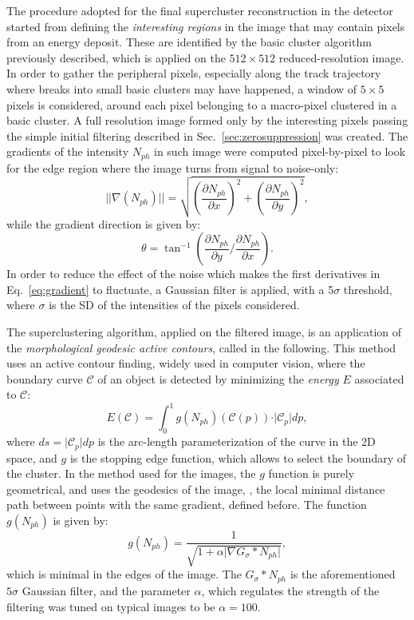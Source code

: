 The procedure adopted for the final supercluster reconstruction in the
\lemon detector started from defining the \textit{interesting regions}
in the image that may contain pixels from an energy deposit. These are
identified by the basic cluster algorithm \idbscan previously
described, which is applied on the $512\times512$ reduced-resolution
image. In order to gather the peripheral pixels, especially along the
track trajectory where breaks into small basic clusters may have happened,
a window of $5\times5$ pixels is considered, around each pixel
belonging to a macro-pixel clustered in a basic cluster. A full
resolution image formed only by the interesting pixels passing the
simple initial filtering described in Sec.~\ref{sec:zerosuppression}
was created.  The gradients of the intensity $N_{ph}$ in such image were
computed pixel-by-pixel to look for the edge region where the image
turns from signal to noise-only:
%
\begin{equation}
\label{eq:gradient}
\vert\vert\nabla(N_{ph})\vert\vert =
\sqrt{\left(\frac{\partial N_{ph}}{\partial x}\right)^2
  +\left(\frac{\partial N_{ph}}{\partial y}\right)^2},
\end{equation}
%
while the gradient direction is given by:
\begin{equation}
  \label{eq:graddir}
  \theta = \tan^{-1}\left(\frac{\partial N_{ph}}{\partial y}/\frac{\partial N_{ph}}{\partial x}\right).
\end{equation}
%
In order to reduce the effect of the noise which makes the first
derivatives in Eq.~\ref{eq:gradient} to fluctuate, a Gaussian filter
is applied, with a 5$\sigma$ threshold, where $\sigma$ is the SD of
the intensities of the pixels considered.

The superclustering algorithm, applied on the filtered image, is an
application of the \textit{morphological geodesic active
contours}\cite{gac,mgac}, called \gac in the following.  This method
uses an active contour finding, widely used in computer vision, where
the boundary curve $\mathcal{C}$ of an object is detected by
minimizing the \textit{energy} $E$  associated to $\mathcal{C}$:
\begin{equation}
  \label{eq:gacenergy}
  E(\mathcal{C}) = \int_{0}^{1} g(N_{ph})(\mathcal{C}(p)) \cdot \vert\mathcal{C}_p\vert dp,
\end{equation}
where $ds=\vert\mathcal{C}_p\vert dp$ is the arc-length parameterization of
the curve in the 2D space, and $g$ is the stopping edge function,
which allows to select the boundary of the cluster.  In the \gac
method used for the \lemon images, the $g$ function is purely
geometrical, and uses the geodesics of the image, \ie, the local
minimal distance path between points with the same gradient, defined
before. The function $g(N_{ph})$ is given by:
\begin{equation}
g(N_{ph}) = \frac{1}{\sqrt{1+\alpha\vert\nabla G_\sigma * N_{ph}\vert}},
\end{equation}
which is minimal in the edges of the image.  The $G_\sigma * N_{ph}$ is the
aforementioned $5\sigma$ Gaussian filter, and the parameter $\alpha$,
which regulates the strength of the filtering was tuned on
typical \lemon images to be $\alpha=100$.

